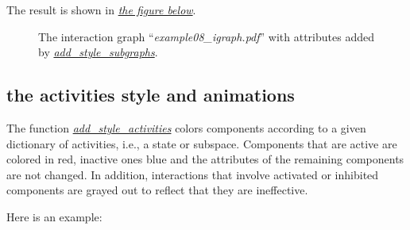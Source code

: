 \documentclass[letterpaper,10pt,english]{sphinxmanual}
\begin{document}
The result is shown in {\hyperref[Manual:figure07]{\emph{the figure below}}}.
\begin{figure}[htbp]
\centering
\capstart

\caption{The interaction graph ``\emph{example08\_igraph.pdf}'' with attributes added by {\hyperref[StateTransitionGraphs:add-style-subgraphs]{\emph{add\_style\_subgraphs}}}.}\label{Manual:figure07}\end{figure}


\subsection{the activities style and animations}
\label{Manual:the-activities-style-and-animations}
The function {\hyperref[InteractionGraphs:add-style-activities]{\emph{add\_style\_activities}}} colors components according to a given dictionary of activities, i.e., a state or subspace.
Components that are active are colored in red, inactive ones blue and the attributes of the remaining components are not changed.
In addition, interactions that involve activated or inhibited components are grayed out to reflect that they are ineffective.

Here is an example:
\end{document}
